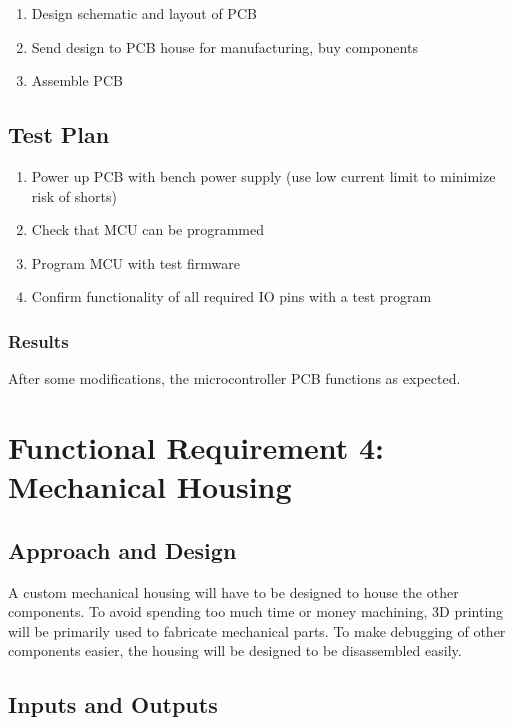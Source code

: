 \documentclass{notes}
\begin{document}
\begin{enumerate}
    \item Design schematic and layout of PCB
    \item Send design to PCB house for manufacturing, buy components
    \item Assemble PCB
\end{enumerate}

\subsection{Test Plan}

\begin{enumerate}
    \item Power up PCB with bench power supply (use low current limit to minimize risk of shorts)
    \item Check that MCU can be programmed
    \item Program MCU with test firmware
    \item Confirm functionality of all required IO pins with a test program
\end{enumerate}

\subsubsection{Results}

After some modifications\footnotemark, the microcontroller PCB functions as expected.

\section{Functional Requirement 4: Mechanical Housing}

\subsection{Approach and Design}

A custom mechanical housing will have to be designed to house the other components.
To avoid spending too much time or money machining, 3D printing will be primarily used to fabricate mechanical parts.
To make debugging of other components easier, the housing will be designed to be disassembled easily.

\subsection{Inputs and Outputs}
\end{document}
